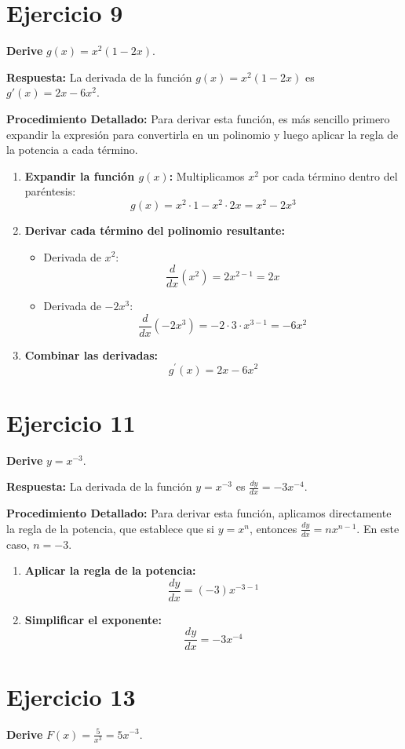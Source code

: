 \documentclass[12pt, a4paper]{article}
\begin{document}
\section{Ejercicio 9}
\textbf{Derive} $g(x)=x^2(1-2x)$.

\textbf{Respuesta:}
La derivada de la función $g(x)=x^2(1-2x)$ es $g'(x)=2x-6x^2$.

\textbf{Procedimiento Detallado:}
Para derivar esta función, es más sencillo primero expandir la expresión para convertirla en un polinomio y luego aplicar la regla de la potencia a cada término.
\begin{enumerate}
    \item \textbf{Expandir la función $g(x)$:} Multiplicamos $x^2$ por cada término dentro del paréntesis:
    \[g(x)=x^2 \cdot 1-x^2 \cdot 2x=x^2-2x^3\]
    \item \textbf{Derivar cada término del polinomio resultante:}
    \begin{itemize}
        \item Derivada de $x^2$:
        \[\frac{d}{dx}(x^2)=2x^{2-1}=2x\]
        \item Derivada de $-2x^3$:
        \[\frac{d}{dx}(-2x^3)=-2 \cdot 3 \cdot x^{3-1}=-6x^2\]
    \end{itemize}
    \item \textbf{Combinar las derivadas:}
    \[g^{\prime}(x)=2x-6x^2\]
\end{enumerate}

\section{Ejercicio 11}
\textbf{Derive} $y=x^{-3}$.

\textbf{Respuesta:}
La derivada de la función $y=x^{-3}$ es $\frac{dy}{dx}=-3x^{-4}$.

\textbf{Procedimiento Detallado:}
Para derivar esta función, aplicamos directamente la regla de la potencia, que establece que si $y=x^n$, entonces $\frac{dy}{dx}=nx^{n-1}$.
En este caso, $n=-3$.
\begin{enumerate}
    \item \textbf{Aplicar la regla de la potencia:}
    \[\frac{dy}{dx}=(-3)x^{-3-1}\]
    \item \textbf{Simplificar el exponente:}
    \[\frac{dy}{dx}=-3x^{-4}\]
\end{enumerate}

\section{Ejercicio 13}
\textbf{Derive} $F(x)=\frac{5}{x^3}=5x^{-3}$.
\end{document}
